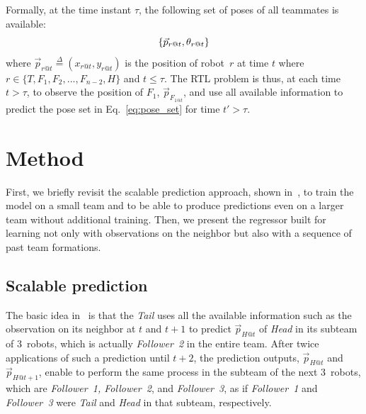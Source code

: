 \documentclass[letterpaper, 10 pt, conference]{ieeeconf}  %
\begin{document}
    Formally, at the time instant $\tau$, the following set of poses of
    all teammates is available:
	\begin{equation}
		\{\vec{p}_{r@t},\theta_{r@t}\} \\
	    \label{eq:pose_set}
	\end{equation}
    where $\vec{p}_{r@t} \overset{\Delta}{=}(x_{r@t}, y_{r@t})$ is the
    position of robot~$r$ at time $t$ where  $r \in \{T, F_{1}, F_{2},
    ..., F_{n-2}, H\}$ and $t \leq \tau$. The RTL problem is thus, at
    each time $t > \tau$, to observe the position of $F_1$,
    $\vec{p}_{F_{1@t}}$, and use all available information to predict
    the pose set in Eq.~\eqref{eq:pose_set} for time $t' > \tau$.


	\section{Method}
	\label{sec:method}

	First, we briefly revisit the scalable prediction approach, shown in~\cite{CPR17},
	to train the model on a small team and to be able to produce predictions
	even on a larger team without additional training.
	Then, we present the regressor built for learning not only with observations on
	the neighbor but also with a sequence of past team formations.

	\subsection{Scalable prediction}
	\label{sec:scalable_prediction}

	The basic idea in~\cite{CPR17} is that the \emph{Tail} uses all the available information
	such as the observation on its neighbor
	at $t$ and $t+1$ to predict $\vec{p}_{H@t}$ of \emph{Head} in its subteam of $3$~robots,
	which is actually \emph{Follower~2} in the entire team.
	After twice applications of such a prediction until $t+2$, the prediction outputs,
	$\vec{p}_{H@t}$ and $\vec{p}_{H@t+1}$, enable
	to perform the same process in the subteam of the next $3$~robots, which are
	\emph{Follower~1, Follower~2}, and \emph{Follower~3}, as if \emph{Follower~1} and
	\emph{Follower~3} were \emph{Tail} and \emph{Head} in that subteam, respectively.
\end{document}
